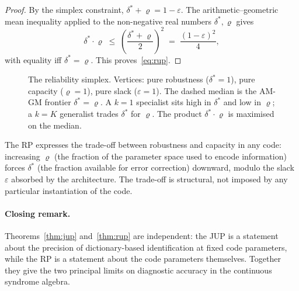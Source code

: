 \documentclass[11pt,a4paper]{article}
\theoremstyle{definition}
\newcommand{\dstar}{\delta^{*}}
\begin{document}
\begin{proof}
By the simplex constraint, $\dstar + \varrho = 1 - \varepsilon$. The arithmetic--geometric mean inequality applied to the non-negative real numbers $\dstar, \varrho$ gives
\[
  \dstar \cdot \varrho \;\leq\; \left(\frac{\dstar + \varrho}{2}\right)^{\!2}
  \;=\; \frac{(1 - \varepsilon)^2}{4},
\]
with equality iff $\dstar = \varrho$. This proves~\eqref{eq:rup}.
\end{proof}

\begin{figure}[H]
\centering
{}
\caption{The reliability simplex. Vertices: pure robustness ($\dstar=1$), pure capacity ($\varrho=1$), pure slack ($\varepsilon=1$). The dashed median is the AM-GM frontier $\dstar = \varrho$. A $k=1$ specialist sits high in $\dstar$ and low in $\varrho$; a $k=K$ generalist trades $\dstar$ for $\varrho$. The product $\dstar\cdot\varrho$ is maximised on the median.}
\label{fig:simplex}
\end{figure}

The RP expresses the trade-off between robustness and capacity in any code: increasing $\varrho$ (the fraction of the parameter space used to encode information) forces $\dstar$ (the fraction available for error correction) downward, modulo the slack $\varepsilon$ absorbed by the architecture. The trade-off is structural, not imposed by any particular instantiation of the code.

\paragraph{Closing remark.}
Theorems~\ref{thm:jup} and~\ref{thm:rup} are independent: the JUP is a statement about the precision of dictionary-based identification at fixed code parameters, while the RP is a statement about the code parameters themselves. Together they give the two principal limits on diagnostic accuracy in the continuous syndrome algebra.
\end{document}
